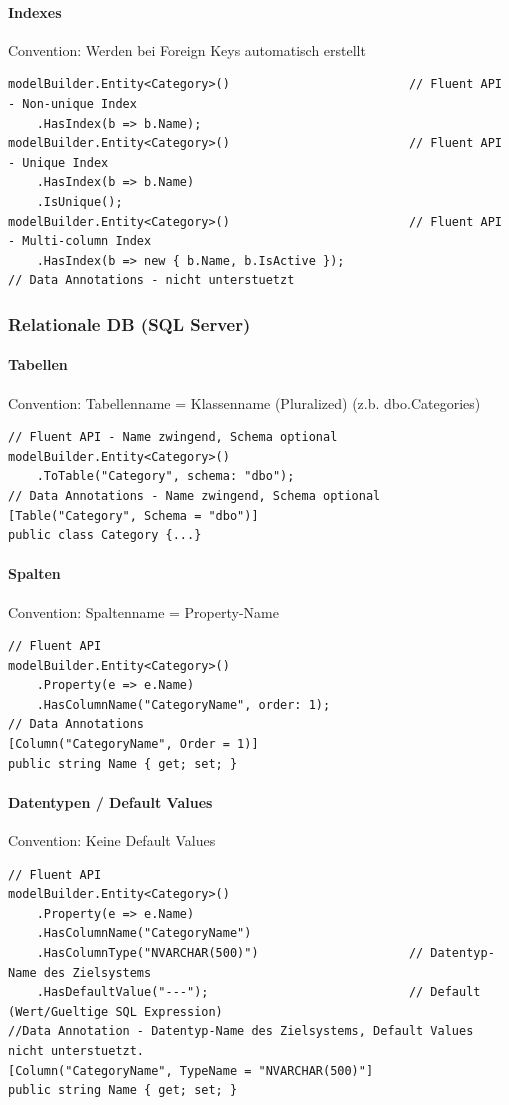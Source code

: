 \documentclass[
a4paper,
oneside,
10pt,
fleqn,
headsepline,
toc=listofnumbered, 
bibliography=totocnumbered]{scrartcl}
\begin{document}
\paragraph{Indexes}
Convention: Werden bei Foreign Keys automatisch erstellt
\begin{lstlisting} 
modelBuilder.Entity<Category>()                         // Fluent API - Non-unique Index
    .HasIndex(b => b.Name);
modelBuilder.Entity<Category>()                         // Fluent API - Unique Index
    .HasIndex(b => b.Name)
    .IsUnique();
modelBuilder.Entity<Category>()                         // Fluent API - Multi-column Index
    .HasIndex(b => new { b.Name, b.IsActive });
// Data Annotations - nicht unterstuetzt
\end{lstlisting}

\subsubsection{Relationale DB (SQL Server)}
\paragraph{Tabellen} Convention: Tabellenname = Klassenname (Pluralized) (z.b. dbo.Categories)
\begin{lstlisting}
// Fluent API - Name zwingend, Schema optional
modelBuilder.Entity<Category>()                         
    .ToTable("Category", schema: "dbo");
// Data Annotations - Name zwingend, Schema optional
[Table("Category", Schema = "dbo")]                     
public class Category {...}
\end{lstlisting}

\paragraph{Spalten}
Convention: Spaltenname = Property-Name
\begin{lstlisting}
// Fluent API
modelBuilder.Entity<Category>()                         
    .Property(e => e.Name)
    .HasColumnName("CategoryName", order: 1);
// Data Annotations
[Column("CategoryName", Order = 1)]                     
public string Name { get; set; }
\end{lstlisting}

\paragraph{Datentypen / Default Values}
Convention: Keine Default Values
\begin{lstlisting}
// Fluent API
modelBuilder.Entity<Category>()                         
    .Property(e => e.Name)
    .HasColumnName("CategoryName")
    .HasColumnType("NVARCHAR(500)")                     // Datentyp-Name des Zielsystems
    .HasDefaultValue("---");                            // Default (Wert/Gueltige SQL Expression)
//Data Annotation - Datentyp-Name des Zielsystems, Default Values nicht unterstuetzt.
[Column("CategoryName", TypeName = "NVARCHAR(500)"] 
public string Name { get; set; }
\end{lstlisting}
\end{document}
